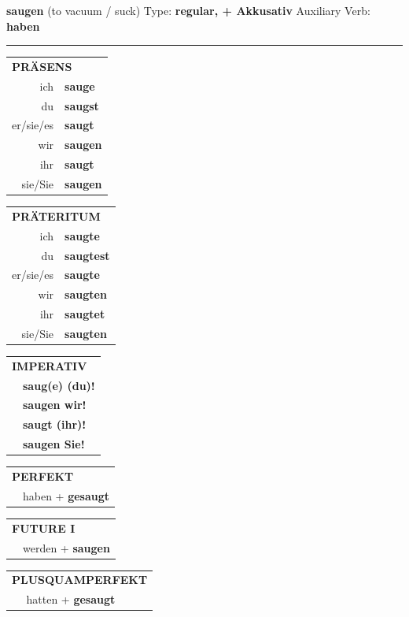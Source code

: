 \documentclass[10pt,a4paper]{revtex4-2}
\begin{document}
\begin{verbbox-acc}
{\Large \bf saugen} (to vacuum / suck) \hfill Type: \textbf{regular, + Akkusativ} \hfill Auxiliary Verb: \textbf{haben}

\vspace{5pt}
\hrule
\vspace{5pt}

\begin{tabular}{rl}
\multicolumn{2}{l}{\textbf{PRÄSENS}}\\
ich & \textbf{sauge}\\
du & \textbf{saugst}\\
er/sie/es & \textbf{saugt}\\
wir & \textbf{saugen}\\
ihr & \textbf{saugt}\\
sie/Sie & \textbf{saugen}\\
\end{tabular}
\hfill
\begin{tabular}{rl}
\multicolumn{2}{l}{\textbf{PRÄTERITUM}}\\
ich & \textbf{saugte}\\
du & \textbf{saugtest}\\
er/sie/es & \textbf{saugte}\\
wir & \textbf{saugten}\\
ihr & \textbf{saugtet}\\
sie/Sie & \textbf{saugten}\\
\end{tabular}
\hfill
\begin{tabular}{rl}
\multicolumn{2}{l}{\textbf{IMPERATIV}}\\
& \textbf{saug(e) (du)!}\\
& \textbf{saugen wir!}\\
& \textbf{saugt (ihr)!}\\
& \textbf{saugen Sie!}\\
\end{tabular}

\vspace{10pt}

\begin{tabular}{rl}
\multicolumn{2}{l}{\textbf{PERFEKT}}\\
& haben + \textbf{gesaugt}\\
\end{tabular}
\hfill
\begin{tabular}{rl}
\multicolumn{2}{l}{\textbf{FUTURE I}}\\
& werden + \textbf{saugen}\\
\end{tabular}
\hfill
\begin{tabular}{rl}
\multicolumn{2}{l}{\textbf{PLUSQUAMPERFEKT}}\\
& hatten + \textbf{gesaugt}\\
\end{tabular}


\end{verbbox-acc}
\end{document}
